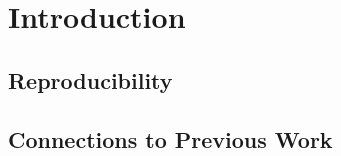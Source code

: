 \chapter{Introduction}\label{ch:Introduction}


\section{Reproducibility}\label{sec:reproducibility}


\section{Connections to Previous Work}\label{sec:previouswork}
